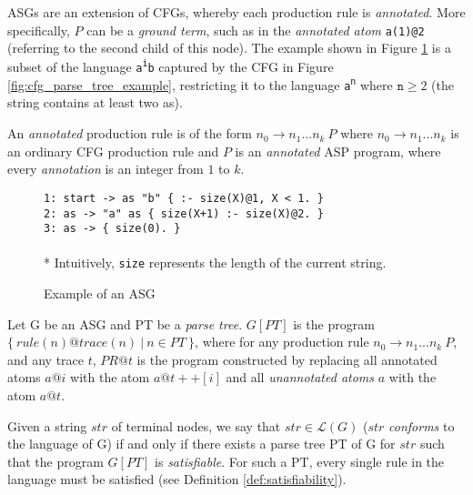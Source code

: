 ASGs are an extension of CFGs, whereby each production rule is \textit{annotated}. More specifically, $P$ can be a \textit{ground term}, such as in the \textit{annotated atom} \texttt{a(1)@2} (referring to the second child of this node). The example shown in Figure \ref{fig:asg_example} is a subset of the language \texttt{a\textsuperscript{i}b} captured by the CFG in Figure \ref{fig:cfg_parse_tree_example},  restricting it to the language \texttt{a\textsuperscript{n}} where $\texttt{n} \ge 2$ (the string contains at least two as).

\begin{definition}
 An \textit{annotated} production rule is of the form $n_0 \to n_1 ... n_k\ P$ where $n_0 \to n_1 ... n_k$ is an ordinary CFG production rule and $P$ is an \textit{annotated} ASP program, where every \textit{annotation} is an integer from $1$ to $k$.
\end{definition}

\begin{figure}[H]
\texttt{1: start -> as "b" \{ :- size(X)@1, X < 1. \} \\
           2: as -> "a" as \space\space\space\{ size(X+1) :- size(X)@2. \} \\
           3: as -> \space\space\space\space\space\space\space\space\space\space\{ size(0). \} \\}\\
* Intuitively, \texttt{size} represents the length of the current string.
\caption{Example of an ASG}
\label{fig:asg_example}
\end{figure}

\begin{definition}
Let G be an ASG and PT be a \textit{parse tree}. $G[PT]$ is the program $\{\ rule(n)@trace(n)\ |\ n \in PT\ \}$, where for any production rule $n_0 \to n_1...n_k\ P$, and any trace $t$, $PR@t$ is the program constructed by replacing all annotated atoms $a@i$ with the atom $a@t++[i]$ and all \textit{unannotated atoms} $a$ with the atom $a@t$.
\end{definition}

\begin{definition}
Given a string $str$ of terminal nodes, we say that $str \in \mathcal{L}(G)$ ($str$ \textit{conforms} to the language of G) if and only if there exists a parse tree PT of G for $str$ such that the program $G[PT]$ is \textit{satisfiable}. For such a PT, every single rule in the language must be satisfied (see Definition \ref{def:satisfiability}).
\end{definition}

